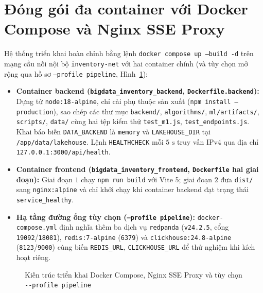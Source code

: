 \section{Đóng gói đa container với Docker Compose và Nginx SSE Proxy}
\label{sec:ch5-docker}
Hệ thống triển khai hoàn chỉnh bằng lệnh \texttt{docker compose up --build -d} trên mạng cầu nối nội bộ \texttt{inventory-net} với hai container chính (và tùy chọn mở rộng qua hồ sơ \texttt{--profile pipeline}, Hình~\ref{fig:docker_topology}):
\begin{itemize}[topsep=0pt, itemsep=1pt]
	\item \textbf{Container backend (\texttt{bigdata_inventory_backend}, \texttt{Dockerfile.backend}):} Dựng từ \texttt{node:18-alpine}, chỉ cài phụ thuộc sản xuất (\texttt{npm install --production}), sao chép các thư mục \texttt{backend/}, \texttt{algorithms/}, \texttt{ml/artifacts/}, \texttt{scripts/}, \texttt{data/} cùng hai tệp kiểm thử \texttt{test_m1.js}, \texttt{test_endpoints.js}. Khai báo biến \texttt{DATA_BACKEND} là \texttt{memory} và \texttt{LAKEHOUSE_DIR} tại \texttt{/app/data/lakehouse}. Lệnh \texttt{HEALTHCHECK} mỗi $5\text{ s}$ truy vấn IPv4 qua địa chỉ \texttt{127.0.0.1:3000/\allowbreak{}api/health}.
	\item \textbf{Container frontend (\texttt{bigdata_inventory_frontend}, \texttt{Dockerfile} hai giai đoạn):} Giai đoạn $1$ chạy \texttt{npm run build} với Vite 5; giai đoạn $2$ đưa \texttt{dist/} sang \texttt{nginx:alpine} và chỉ khởi chạy khi container backend đạt trạng thái \texttt{service_healthy}.
	\item \textbf{Hạ tầng đường ống tùy chọn (\texttt{--profile pipeline}):} \texttt{docker-compose.yml} định nghĩa thêm ba dịch vụ \texttt{redpanda} (\texttt{v24.2.5}, cổng \texttt{19092}/\texttt{18081}), \texttt{redis:7-alpine} (\texttt{6379}) và \texttt{clickhouse:24.8-alpine} (\texttt{8123}/\texttt{9000}) cùng biến \texttt{REDIS_URL}, \texttt{CLICKHOUSE_URL} để thử nghiệm khi kích hoạt riêng.
\end{itemize}

\begin{figure}[H]
	\centering
	\caption{Kiến trúc triển khai Docker Compose, Nginx SSE Proxy và tùy chọn \texttt{-{}-profile pipeline}}
	\label{fig:docker_topology}
\end{figure}


